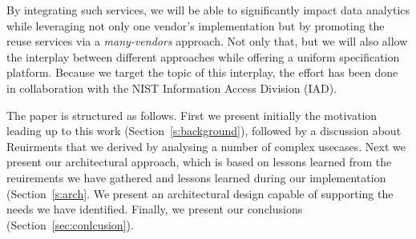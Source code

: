 By integrating such services, we will be able to significantly impact
data analytics while leveraging not only one vendor's implementation
but by promoting the reuse services via a {\em many-vendors}
approach. Not only that, but we will also allow the interplay between
different approaches while offering a uniform specification platform.
Because we target the topic of this interplay, the effort has been
done in collaboration with the NIST Information Access Division (IAD).

The paper is structured as follows. First we present initially the
motivation leading up to this work (Section~\ref{s:background}),
followed by a discussion about Reuirments that we derived by analysing
a number of complex usecases. Next we present our architectural
approach, which is based on lessons learned from the reuirements we
have gathered and lessons learned during our implementation
(Section~\ref{s:arch}. We present an architectural design capable of
supporting the needs we have identified.  Finally, we present our
conclusions (Section~\ref{sec:conlcusion}).
